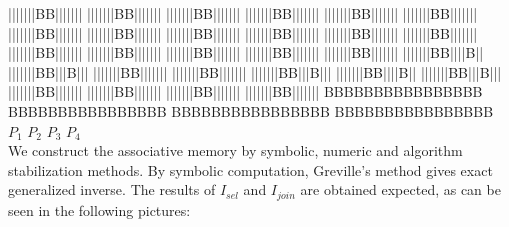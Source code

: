 {|||||||BB||||||| \hspace{1em} |||||||BB||||||| \hspace{1em} |||||||BB||||||| \hspace{1em} |||||||BB|||||||
|||||||BB||||||| \hspace{1em} |||||||BB||||||| \hspace{1em} |||||||BB||||||| \hspace{1em} |||||||BB|||||||
|||||||BB||||||| \hspace{1em} |||||||BB||||||| \hspace{1em} |||||||BB||||||| \hspace{1em} |||||||BB|||||||
|||||||BB||||||| \hspace{1em} |||||||BB||||||| \hspace{1em} |||||||BB||||||| \hspace{1em} |||||||BB|||||||
|||||||BB||||||| \hspace{1em} |||||||BB||||B|| \hspace{1em} |||||||BB|||B||| \hspace{1em} |||||||BB|||||||
|||||||BB||||||| \hspace{1em} |||||||BB|||B||| \hspace{1em} |||||||BB||||B|| \hspace{1em} |||||||BB|||B|||
|||||||BB||||||| \hspace{1em} |||||||BB||||||| \hspace{1em} |||||||BB||||||| \hspace{1em} |||||||BB|||||||
BBBBBBBBBBBBBBBB \hspace{1em} BBBBBBBBBBBBBBBB \hspace{1em} BBBBBBBBBBBBBBBB \hspace{1em} BBBBBBBBBBBBBBBB \\
} 
\hspace*{2em} {\large $P_1 $ } \hspace{6.5em} {\large $P_2 $ } \hspace{6.5em} {\large $P_3 $} \hspace{6.5em} {\large $P_4 $} 
\ \\
We construct the associative memory by symbolic, numeric 
and algorithm stabilization methods.  
By symbolic computation, Greville's method gives exact 
generalized inverse.  The results of $I_{sel} $ and $I_{join} $ 
are obtained expected, as can be seen in the following pictures:
